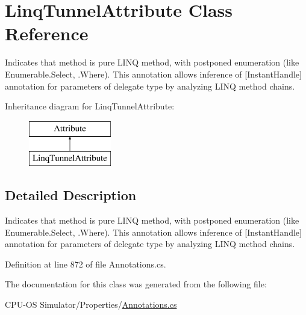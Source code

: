 \hypertarget{class_linq_tunnel_attribute}{}\section{Linq\+Tunnel\+Attribute Class Reference}
\label{class_linq_tunnel_attribute}


Indicates that method is pure L\+I\+N\+Q method, with postponed enumeration (like Enumerable.\+Select, .Where). This annotation allows inference of \mbox{[}Instant\+Handle\mbox{]} annotation for parameters of delegate type by analyzing L\+I\+N\+Q method chains.  


Inheritance diagram for Linq\+Tunnel\+Attribute\+:\begin{figure}[H]
\begin{center}
\leavevmode
\includegraphics[height=2.000000cm]{class_linq_tunnel_attribute}
\end{center}
\end{figure}


\subsection{Detailed Description}
Indicates that method is pure L\+I\+N\+Q method, with postponed enumeration (like Enumerable.\+Select, .Where). This annotation allows inference of \mbox{[}Instant\+Handle\mbox{]} annotation for parameters of delegate type by analyzing L\+I\+N\+Q method chains. 



Definition at line 872 of file Annotations.\+cs.



The documentation for this class was generated from the following file\+:\begin{DoxyCompactItemize}
\item 
C\+P\+U-\/\+O\+S Simulator/\+Properties/\hyperlink{_annotations_8cs}{Annotations.\+cs}\end{DoxyCompactItemize}
